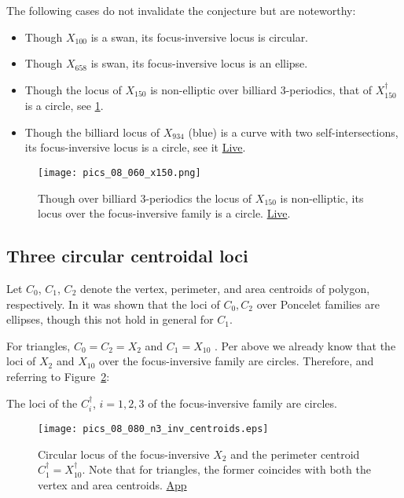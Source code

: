 The following cases do not invalidate the conjecture but are noteworthy:

\begin{itemize}
    \item Though $X_{100}$ is a swan, its focus-inversive locus is circular.
    \item Though $X_{658}$ is swan, its focus-inversive locus is an ellipse.
    \item Though the locus of $X_{150}$ is non-elliptic over billiard 3-periodics, that of $X_{150}^\dagger$ is a circle, see \cref{fig:08-x150}.
    \item Though the billiard locus of $X_{934}$ (blue) is a curve with two self-intersections, its focus-inversive locus is a circle, see it \href{https://bit.ly/3fUicrY}{Live}.
\end{itemize}


\begin{figure}
    \centering
    \texttt{[image: pics\_08\_060\_x150.png]}
    \caption{Though over billiard 3-periodics the locus of $X_{150}$ is non-elliptic, its locus over the focus-inversive family is a circle. \href{https://bit.ly/34v5Pgz}{Live}.}
    \label{fig:08-x150}
\end{figure}

\subsection{Three circular centroidal loci}

Let $C_0$, $C_1$, $C_2$ denote the vertex, perimeter, and area centroids of polygon, respectively. In \cite[Thm 1]{schwartz2016-com} it was shown that the loci of $C_0,C_2$ over Poncelet families are ellipses, though this not hold in general for $C_1$.

For triangles, $C_0=C_2=X_2$ and $C_1=X_{10}$ \cite[Spieker Center]{mw}. Per above we already know that the loci of $X_{2}$ and $X_{10}$ over the focus-inversive family are circles. Therefore, and referring to Figure~\ref{fig:n3-centroids}:

\begin{corollary}
The loci of the $C_i^\dagger$, $i=1,2,3$ of the focus-inversive family are circles.
\end{corollary}

\begin{figure}
    \centering
    \texttt{[image: pics\_08\_080\_n3\_inv\_centroids.eps]}
    \caption{Circular locus of the focus-inversive $X_2$ and the perimeter centroid $C_1^\dagger=X_{10}^\dagger$. Note that for triangles, the former coincides with both the vertex and area centroids. \href{https://bit.ly/3kYnGlP}{App}}
    \label{fig:n3-centroids}
\end{figure}

